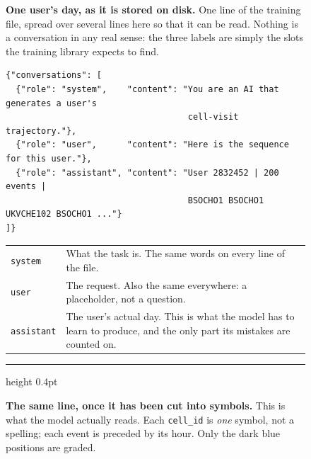 \begin{figure}[H]
\centering

{\textbf{ One user's day, as it is stored on disk.} One line of the
training file, spread over several lines here so that it can be read. Nothing is
a conversation in any real sense: the three labels are simply the slots the
training library expects to find.\par}
\vspace{3pt}

\begin{lstlisting}
{"conversations": [
  {"role": "system",    "content": "You are an AI that generates a user's
                                    cell-visit trajectory."},
  {"role": "user",      "content": "Here is the sequence for this user."},
  {"role": "assistant", "content": "User 2832452 | 200 events |
                                    BSOCHO1 BSOCHO1 UKVCHE102 BSOCHO1 ..."}
]}
\end{lstlisting}

\vspace{2pt}
{\footnotesize
\begin{tabular}{@{}p{2.2cm}p{10.75cm}@{}}
\texttt{system} & What the task is. The same words on every line of the file. \\
\texttt{user}   & The request. Also the same everywhere: a placeholder, not a
                  question. \\
\texttt{assistant} & The user's actual day. This is what the model has to
                  learn to produce, and the only part its mistakes are counted
                  on. \\
\end{tabular}\par}

\vspace{0.55cm}
\hrule height 0.4pt
\vspace{0.45cm}

{\textbf{ The same line, once it has been cut into symbols.} This is what
the model actually reads. Each \texttt{cell\_id} is \emph{one} symbol, not a spelling;
each event is preceded by its hour. Only the dark blue positions are graded.\par}
\vspace{5pt}


\end{figure}
